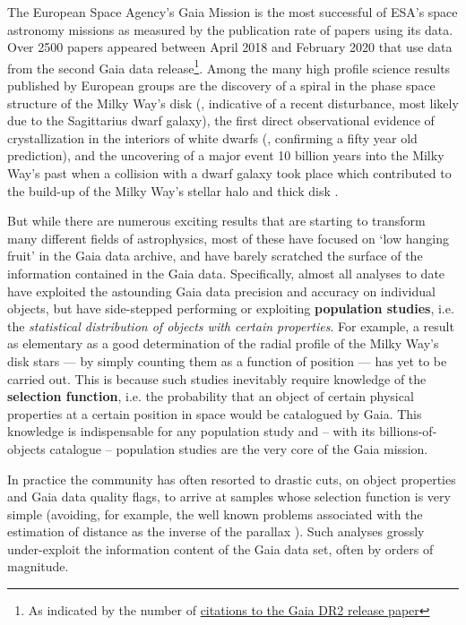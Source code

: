 The European Space Agency's Gaia Mission \cite{2016A&A...595A...1G} is the most successful of ESA's space astronomy missions as measured by the publication rate of papers using its data. Over 2500 papers appeared between April 2018 and February 2020 that use data from the second Gaia data release\footnote{As indicated by the number of  \href{https://ui.adsabs.harvard.edu/search/q=citations(bibcode\%3A2018A\%26A...616A...1G)&sort=date\%20desc\%2C\%20bibcode\%20desc&p_=0}{citations to the Gaia DR2 release paper}}. Among the many high profile science results published by European groups are the discovery of a spiral in the phase space structure of the Milky Way's disk (\cite{2018Natur.561..360A}, indicative of a recent disturbance, most likely due to the Sagittarius dwarf galaxy), the first direct observational evidence of crystallization in the interiors of white dwarfs (\cite{2019Natur.565..202T}, confirming a fifty year old prediction), and the uncovering of a major event 10 billion years into the Milky Way's past when a collision with a dwarf galaxy took place which contributed to the build-up of the Milky Way's stellar halo and thick disk \cite{2018Natur.563...85H, 2018MNRAS.478..611B, 2019arXiv190904679B}. 

But while there are numerous exciting results that are starting to transform many different fields of astrophysics, most of these have focused on `low hanging fruit' in the Gaia data archive, and have barely scratched the surface of the information contained in the Gaia data. Specifically, almost all analyses to date have exploited the astounding Gaia data precision and accuracy on individual objects, but have side-stepped performing or exploiting \textbf{population studies}, i.e. the \textsl{statistical distribution of objects with certain properties}. For example, a result as elementary as a good determination of the radial profile of the Milky Way's disk stars --- by simply counting them as a function of position --- has yet to be carried out. This is because such studies inevitably require knowledge of the \textbf{selection function}, i.e. the probability that an object of certain physical properties at a certain position in space would be catalogued by Gaia. This knowledge is indispensable for any population study and -- with its billions-of-objects catalogue -- population studies are the very core of the Gaia mission.

In practice the community has often resorted to drastic cuts, on object properties and Gaia data quality flags, to arrive at samples whose selection function is very simple (avoiding, for example, the well known problems associated with the estimation of distance as the inverse of the parallax \cite{2018A&A...616A...9L}). Such analyses grossly under-exploit the information content of the Gaia data set, often by orders of magnitude.

